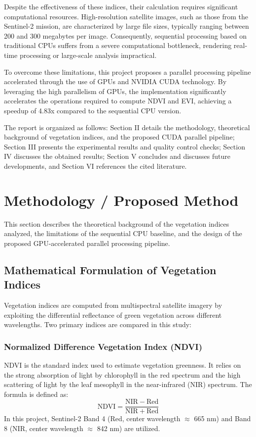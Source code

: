 \documentclass[10pt,conference,compsoc]{IEEEtran}
\begin{document}
Despite the effectiveness of these indices, their calculation requires significant computational resources. High-resolution satellite images, such as those from the Sentinel-2 mission, are characterized by large file sizes, typically ranging between 200 and 300 megabytes per image. Consequently, sequential processing based on traditional CPUs suffers from a severe computational bottleneck, rendering real-time processing or large-scale analysis impractical.

To overcome these limitations, this project proposes a parallel processing pipeline accelerated through the use of GPUs and NVIDIA CUDA technology. By leveraging the high parallelism of GPUs, the implementation significantly accelerates the operations required to compute NDVI and EVI, achieving a speedup of 4.83x compared to the sequential CPU version.

The report is organized as follows: Section II details the methodology, theoretical background of vegetation indices, and the proposed CUDA parallel pipeline; Section III presents the experimental results and quality control checks; Section IV discusses the obtained results; Section V concludes and discusses future developments, and Section VI references the cited literature.

\section{Methodology / Proposed Method}
This section describes the theoretical background of the vegetation indices analyzed, the limitations of the sequential CPU baseline, and the design of the proposed GPU-accelerated parallel processing pipeline.

\subsection{Mathematical Formulation of Vegetation Indices}
Vegetation indices are computed from multispectral satellite imagery by exploiting the differential reflectance of green vegetation across different wavelengths. Two primary indices are compared in this study:

\subsubsection{Normalized Difference Vegetation Index (NDVI)}
NDVI is the standard index used to estimate vegetation greenness. It relies on the strong absorption of light by chlorophyll in the red spectrum and the high scattering of light by the leaf mesophyll in the near-infrared (NIR) spectrum. The formula is defined as:
\begin{equation}
\mathrm{NDVI} = \frac{\mathrm{NIR} - \mathrm{Red}}{\mathrm{NIR} + \mathrm{Red}}
\label{eq:ndvi}
\end{equation}
In this project, Sentinel-2 Band 4 (Red, center wavelength $\approx$ 665 nm) and Band 8 (NIR, center wavelength $\approx$ 842 nm) are utilized.
\end{document}
